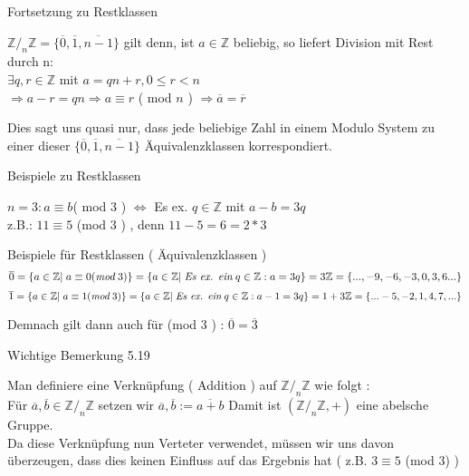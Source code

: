 \documentclass[smallheadings,12pt,a4paper]{scrartcl}
\begin{document}
\begin{center}
\item[Fortsetzung zu Restklassen]
\end{center}
\item $ \mathbb{Z} /_n \mathbb{Z} = \{\overline{0},\overline{1},\overline{n-1}\} $ gilt denn, ist $ a \in \mathbb{Z} $ beliebig, so liefert Division mit Rest durch n: \\
$ \exists q,r \in \mathbb{Z} $ mit $ a = qn+r , 0 \leq r < n $ \\
$ \Rightarrow a-r = qn \Rightarrow a \equiv r $ ( mod $n$ ) $ \Rightarrow \overline{a} = \overline{r} $ \\
\item Dies sagt uns quasi nur, dass jede beliebige Zahl in einem Modulo System zu einer dieser $\{\overline{0},\overline{1},\overline{n-1}\} $ Äquivalenzklassen korrespondiert. 
\begin{center}
\item[Beispiele zu Restklassen]
\end{center}
\item $ n=3 : a \equiv b $( mod $3$ ) $\Leftrightarrow $ Es ex. $ q \in \mathbb{Z} $ mit $a-b = 3q $ \\
z.B.: $ 11 \equiv 5 $ (mod 3 ) , denn $11-5 = 6 = 2*3$ 
\item Beispiele für Restklassen ( Äquivalenzklassen ) \\
$$ \overline{0} = \{a \in \mathbb{Z}| \; a \equiv 0 (\textit{mod} \; 3 ) \} = \\
 \{a \in \mathbb{Z}| \; \textit{Es ex. ein} \; q \in \mathbb{Z} : a = 3q \} = 3 \mathbb{Z} = \{...,-9,-6,-3,0,3,6...\} $$
 $$ \overline{1} = \{a \in \mathbb{Z}| \; a \equiv 1 (\textit{mod} \; 3 ) \} = \\
 \{a \in \mathbb{Z}| \; \textit{Es ex. ein} \; q \in \mathbb{Z} : a-1 = 3q \} = 1+ 3 \mathbb{Z} = \{...-5,-2,1,4,7,...\} $$
 
Demnach gilt dann auch für (mod $3$ ) : $ \overline{0} = \overline{3} $

\begin{center}
\item[Wichtige Bemerkung 5.19]
\end{center}
\item Man definiere eine Verknüpfung ( Addition ) auf $ \mathbb{Z} /_n \mathbb{Z}$ wie folgt : \\
Für $ \overline{a}, \overline{b} \in  \mathbb{Z} /_n \mathbb{Z} $ setzen wir $ \overline{a}, \overline{b} := \overline{a+b}$
Damit ist $(\mathbb{Z} /_n \mathbb{Z} , + )$ eine abelsche Gruppe. \\
Da diese Verknüpfung nun Verteter verwendet, müssen wir uns davon überzeugen, dass dies keinen Einfluss auf das Ergebnis hat ( z.B. $ 3 \equiv 5 $ (mod $3$) )
\end{document}
